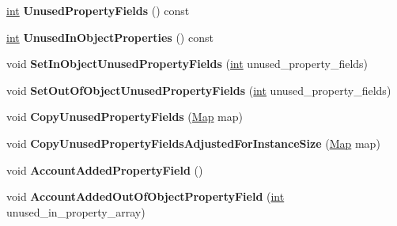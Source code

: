 \begin{DoxyCompactItemize}
\item 
\mbox{\label{classv8_1_1internal_1_1Map_aef431f28ad27bffb4f5bdfe702d44550}} 
\mbox{\hyperlink{classint}{int}} {\bfseries Unused\+Property\+Fields} () const
\item 
\mbox{\label{classv8_1_1internal_1_1Map_ab94df6b2faae77c4abbde466f0b1dc87}} 
\mbox{\hyperlink{classint}{int}} {\bfseries Unused\+In\+Object\+Properties} () const
\item 
\mbox{\label{classv8_1_1internal_1_1Map_abb613781f992c32135465ee023ff6bf5}} 
void {\bfseries Set\+In\+Object\+Unused\+Property\+Fields} (\mbox{\hyperlink{classint}{int}} unused\+\_\+property\+\_\+fields)
\item 
\mbox{\label{classv8_1_1internal_1_1Map_a4c842a1ac17e3130b7804ccd527a24c0}} 
void {\bfseries Set\+Out\+Of\+Object\+Unused\+Property\+Fields} (\mbox{\hyperlink{classint}{int}} unused\+\_\+property\+\_\+fields)
\item 
\mbox{\label{classv8_1_1internal_1_1Map_a8c3e5ad15d1884c32455e1ea33fc5c90}} 
void {\bfseries Copy\+Unused\+Property\+Fields} (\mbox{\hyperlink{classv8_1_1internal_1_1Map}{Map}} map)
\item 
\mbox{\label{classv8_1_1internal_1_1Map_ab6816ef24a74a8eb0cb4b0610b215d37}} 
void {\bfseries Copy\+Unused\+Property\+Fields\+Adjusted\+For\+Instance\+Size} (\mbox{\hyperlink{classv8_1_1internal_1_1Map}{Map}} map)
\item 
\mbox{\label{classv8_1_1internal_1_1Map_ab43a90ef7afe2793db6079455a6f77bc}} 
void {\bfseries Account\+Added\+Property\+Field} ()
\item 
\mbox{\label{classv8_1_1internal_1_1Map_a218fd35357acfefb8b5acb42368bd66f}} 
void {\bfseries Account\+Added\+Out\+Of\+Object\+Property\+Field} (\mbox{\hyperlink{classint}{int}} unused\+\_\+in\+\_\+property\+\_\+array)
\item 
\mbox{\label{classv8_1_1internal_1_1Map_a3aa89e8bfaf93b4b94ea7c84afb3320a}} 

\end{DoxyCompactItemize}
